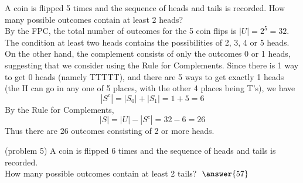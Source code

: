 \documentclass[handout]{ximera}
\begin{document}
\begin{example}[example 5]
A coin is flipped 5 times and the sequence of heads and tails is recorded.  
How many possible outcomes contain at least 2 heads?\\
By the FPC, the total number of outcomes for the 5 coin flips is $|U| = 2^5 = 32$. 
The condition at least two heads contains the possibilities of 2, 3, 4 or 5 heads.  
On the other hand, the complement consists of only the outcomes 0 or 1 heads, suggesting that we consider 
using the Rule for Complements. Since there is 1 way to get 0 heads (namely TTTTT), and there are 5 ways to get exactly 1 heads (the H can go in any one of 5 places, with the other 4 places being T's), we have
\[
|S^c| = |S_0| + |S_1| = 1 + 5 = 6
\]
By the Rule for Complements, 
\[
|S| = |U| - |S^c| = 32 -6 = 26
\]
Thus there are 26 outcomes consisting of 2 or more heads.
\end{example}

\begin{problem}(problem 5)
A coin is flipped 6 times and the sequence of heads and tails is recorded.\\
How many possible outcomes contain at least 2 tails? $\; \answer{57}$
\end{problem}
\end{document}
